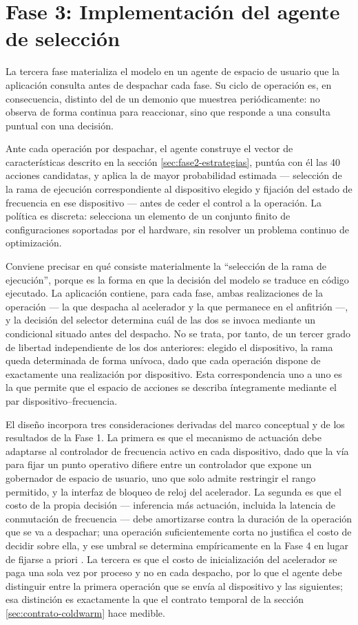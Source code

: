 \documentclass[12pt,oneside,spanish]{book}
\begin{document}
\section{Fase 3: Implementación del agente de selección}
\label{sec:fase3}

La tercera fase materializa el modelo en un agente de espacio de usuario que la aplicación consulta antes de despachar cada fase. Su ciclo de operación es, en consecuencia, distinto del de un demonio que muestrea periódicamente: no observa de forma continua para reaccionar, sino que responde a una consulta puntual con una decisión.

Ante cada operación por despachar, el agente construye el vector de características descrito en la sección \ref{sec:fase2-estrategias}, puntúa con él las 40 acciones candidatas, y aplica la de mayor probabilidad estimada --- selección de la rama de ejecución correspondiente al dispositivo elegido y fijación del estado de frecuencia en ese dispositivo --- antes de ceder el control a la operación. La política es discreta: selecciona un elemento de un conjunto finito de configuraciones soportadas por el hardware, sin resolver un problema continuo de optimización.

Conviene precisar en qué consiste materialmente la ``selección de la rama de ejecución'', porque es la forma en que la decisión del modelo se traduce en código ejecutado. La aplicación contiene, para cada fase, ambas realizaciones de la operación --- la que despacha al acelerador y la que permanece en el anfitrión ---, y la decisión del selector determina cuál de las dos se invoca mediante un condicional situado antes del despacho. No se trata, por tanto, de un tercer grado de libertad independiente de los dos anteriores: elegido el dispositivo, la rama queda determinada de forma unívoca, dado que cada operación dispone de exactamente una realización por dispositivo. Esta correspondencia uno a uno es la que permite que el espacio de acciones se describa íntegramente mediante el par dispositivo--frecuencia.

El diseño incorpora tres consideraciones derivadas del marco conceptual y de los resultados de la Fase 1. La primera es que el mecanismo de actuación debe adaptarse al controlador de frecuencia activo en cada dispositivo, dado que la vía para fijar un punto operativo difiere entre un controlador que expone un gobernador de espacio de usuario, uno que solo admite restringir el rango permitido, y la interfaz de bloqueo de reloj del acelerador. La segunda es que el costo de la propia decisión --- inferencia más actuación, incluida la latencia de conmutación de frecuencia --- debe amortizarse contra la duración de la operación que se va a despachar; una operación suficientemente corta no justifica el costo de decidir sobre ella, y ese umbral se determina empíricamente en la Fase 4 en lugar de fijarse a priori \cite{Hebbar2022,Velicka2025}. La tercera es que el costo de inicialización del acelerador se paga una sola vez por proceso y no en cada despacho, por lo que el agente debe distinguir entre la primera operación que se envía al dispositivo y las siguientes; esa distinción es exactamente la que el contrato temporal de la sección \ref{sec:contrato-coldwarm} hace medible.
\end{document}
